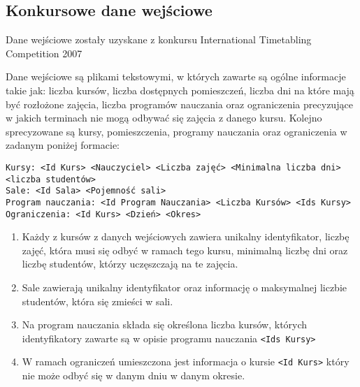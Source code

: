 \subsection{Konkursowe dane wejściowe}
\par Dane wejściowe zostały uzyskane z konkursu International Timetabling Competition 2007
\par Dane wejściowe są plikami tekstowymi, w których zawarte są ogólne informacje takie jak: liczba kursów, liczba dostępnych pomieszczeń, liczba dni na które mają być rozłożone zajęcia, liczba programów nauczania oraz ograniczenia precyzujące w jakich terminach nie mogą odbywać się zajęcia z danego kursu. Kolejno sprecyzowane są kursy, pomieszczenia, programy nauczania oraz ograniczenia w zadanym poniżej formacie:
\begin{verbatim}
Kursy: <Id Kurs> <Nauczyciel> <Liczba zajęć> <Minimalna liczba dni> <liczba studentów>
Sale: <Id Sala> <Pojemność sali>
Program nauczania: <Id Program Nauczania> <Liczba Kursów> <Ids Kursy>
Ograniczenia: <Id Kurs> <Dzień> <Okres>
\end{verbatim}
\begin{enumerate}
\item Każdy z kursów z danych wejściowych zawiera unikalny identyfikator, liczbę zajęć, która musi się odbyć w ramach tego kursu, minimalną liczbę dni oraz liczbę studentów, którzy uczęszczają na te zajęcia. 
\item Sale zawierają unikalny identyfikator oraz informację o maksymalnej liczbie studentów, która się zmieści w sali.
\item Na program nauczania składa się określona liczba kursów, których identyfikatory zawarte są w opisie programu nauczania  \verb#<Ids Kursy>#

\item W ramach ograniczeń umieszczona jest informacja o kursie \verb#<Id Kurs>#
 który nie może odbyć się w danym dniu w danym okresie.
\end{enumerate}
